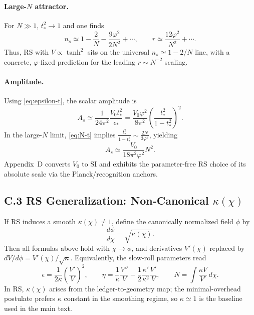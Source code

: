 \documentclass[11pt]{article}
\theoremstyle{definition}
\theoremstyle{remark}
\begin{document}
\paragraph{Large-$N$ attractor.}
For $N\gg 1$, $t_*^2\to 1$ and one finds
\begin{equation}
n_s \simeq 1-\frac{2}{N}-\frac{9\varphi^2}{2N^2}+\cdots,\qquad
r \simeq \frac{12\varphi^2}{N^2}+\cdots.
\label{eq:attractor}
\end{equation}
Thus, RS with $V\propto\tanh^2$ sits on the universal $n_s\simeq 1-2/N$ line, with a concrete, $\varphi$-fixed prediction for the leading $r\sim N^{-2}$ scaling.

\paragraph{Amplitude.}
Using \eqref{eq:epsilon-t}, the scalar amplitude is
\begin{equation}
A_s \simeq \frac{1}{24\pi^2}\frac{V_0 t_*^2}{\epsilon_*}
=\frac{V_0\varphi^2}{8\pi^2}\left(\frac{t_*^2}{1-t_*^2}\right)^{\!2}.
\label{eq:As-exact}
\end{equation}
In the large-$N$ limit, \eqref{eq:N-t} implies $\frac{t_*^2}{1-t_*^2}\sim\frac{2N}{3\varphi^2}$, yielding
\begin{equation}
A_s \simeq \frac{V_0}{18\pi^2\varphi^2}N^2.
\label{eq:As-largeN}
\end{equation}
Appendix~D converts $V_0$ to SI and exhibits the parameter-free RS choice of its absolute scale via the Planck/recognition anchors.

\subsection*{C.3 RS Generalization: Non-Canonical $\kappa(\chi)$}
If RS induces a smooth $\kappa(\chi)\neq 1$, define the canonically normalized field $\phi$ by
\begin{equation}
\frac{d\phi}{d\chi}=\sqrt{\kappa(\chi)}.
\label{eq:canon}
\end{equation}
Then all formulas above hold with $\chi\to\phi$, and derivatives $V'(\chi)$ replaced by $dV/d\phi=V'(\chi)/\sqrt{\kappa}$. Equivalently, the slow-roll parameters read
\begin{equation}
\epsilon=\frac{1}{2\kappa}\left(\frac{V'}{V}\right)^{\!2},\qquad
\eta=\frac{1}{\kappa}\frac{V''}{V}-\frac{1}{2}\frac{\kappa'}{\kappa^2}\frac{V'}{V},\qquad
N=\int \frac{\kappa V}{V'}\,d\chi.
\label{eq:SR-kappa}
\end{equation}
In RS, $\kappa(\chi)$ arises from the ledger-to-geometry map; the minimal-overhead postulate prefers $\kappa$ constant in the smoothing regime, so $\kappa\simeq 1$ is the baseline used in the main text.
\end{document}
